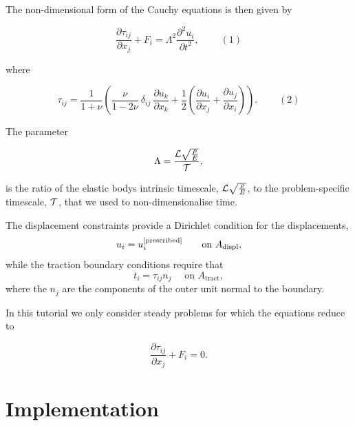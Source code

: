 The non-\/dimensional form of the Cauchy equations is then given by \begin{center} \[ \frac{\partial \tau_{ij}}{\partial x_j} + F_i = \Lambda^2 \frac{\partial^2 u_i}{\partial t^2}, \ \ \ \ \ \ \ \ \ \ (1) \] \end{center}  where \begin{center} \[ \tau_{ij} = \frac{1}{1+\nu} \left(\frac{\nu}{1-2\nu} \ \delta_{ij} \ \frac{\partial u_k}{\partial x_k} + \frac{1}{2} \left(\frac{\partial u_i}{\partial x_j}+ \frac{\partial u_j}{\partial x_i} \right) \right). \ \ \ \ \ \ \ \ \ \ (2) \] \end{center}  The parameter \begin{center} \[ \Lambda = \frac{{\cal L} \sqrt{\frac{\rho}{E}} }{\cal T}, \] \end{center}  is the ratio of the elastic body\textquotesingle{}s intrinsic timescale, $ {\cal L} \sqrt{\frac{\rho}{E}} $, to the problem-\/specific timescale, $ {\cal T} $, that we used to non-\/dimensionalise time.

The displacement constraints provide a Dirichlet condition for the displacements, \[ u_i = u_i^{[\rm prescribed]} \ \ \ \ \ \ \mbox{on $A_{\mathrm{displ}}$}, \] while the traction boundary conditions require that \[ t_i = \tau_{ij} n_j \ \ \ \ \ \ \mbox{on $A_{\mathrm{tract}},$} \] where the $ n_j $ are the components of the outer unit normal to the boundary.

In this tutorial we only consider steady problems for which the equations reduce to \begin{center} \[ \frac{\partial \tau_{ij}}{\partial x_j} + F_i = 0. \] \end{center} 



 

\hypertarget{index_element_types}{}\section{Implementation}\label{index_element_types}


